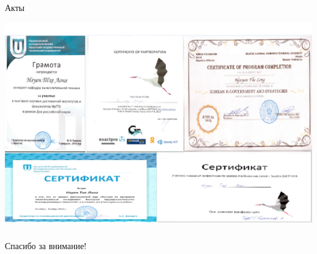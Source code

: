 \documentclass[10pt,pdf,hyperref={unicode},xcolor=table]{beamer}
\begin{document}
\begin{frame}{Акты}	 
\begin{center}
     \includegraphics[width=1\linewidth]{p24}
\end{center}
			\end{frame}
\begin{frame}[fragile]
  \frametitle{}
\textcolor[rgb]{1,0,0}{\Huge{\centerline{ Спасибо за внимание!}}   } 
\end{frame}
\end{document}
